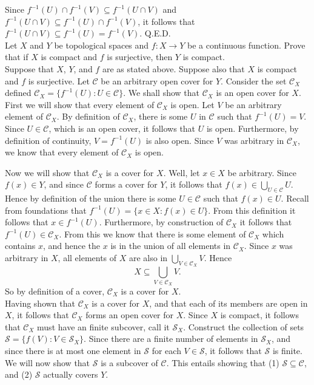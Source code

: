 \documentclass{article}
\newcommand{\inv}[1]{#1^{-1}}
\newcommand{\inv}[1]{#1^{-1}}
\begin{document}
Since $\inv{f}(U)\cap \inv{f}(V) \subseteq \inv{f}(U\cap V) $ and $\inv{f}(U\cap V) \subseteq  \inv{f}(U)\cap \inv{f}(V)$, it follows that $\inv{f}(U\cap V) \subseteq  \inv{f}(U)= \inv{f}(V)$. Q.E.D.\\


  Let $X$ and $Y$ be topological spaces and $f:X \rightarrow Y$ be a continuous function. 
Prove that if $X$ is compact and $f$ is surjective, then $Y$ is compact.\\

 Suppose that $X$, $Y$, and $f$ are as stated above. Suppose also that $X$ is compact and $f$ is surjective. Let $\mathcal{C}$ be an arbitrary open cover for $Y$. Consider the set $\mathcal{C}_X$ defined $\mathcal{C}_X = \{\inv{f}(U):U\in \mathcal{C}\}$. We shall show that $\mathcal{C}_X$ is an open cover for $X$.\\

First we will show that every element of $\mathcal{C}_X$ is open. Let $V$ be an arbitrary element of $\mathcal{C}_X$. By definition of $\mathcal{C}_X$, there is some $U$ in $\mathcal{C}$ such that $\inv{f}(U) = V$. Since $U\in \mathcal{C}$, which is an open cover, it follows that $U$ is open. Furthermore, by definition of continuity, $V = \inv{f}(U)$ is also open. Since $V$ was arbitrary in $\mathcal{C}_X$, we know that every element of $\mathcal{C}_X$ is open. 

Now we will show that $\mathcal{C}_X$ is a cover for $X$. Well, let $x\in X$ be arbitrary. Since $f(x)\in Y$, and since $\mathcal{C}$ forms a cover for $Y$, it follows that $f(x)\in \bigcup_{U\in \mathcal{C}}U$. Hence by definition of the union there is some $U\in \mathcal{C}$ such that $f(x)\in U$. Recall from foundations that $\inv{f}(U) = \{x\in X: f(x)\in U\}$. From this definition it follows that $x\in \inv{f}(U)$. Furthermore, by construction of $\mathcal{C}_X$ it follows that $\inv{f}(U)\in \mathcal{C}_X$. From this we know that there is some element of $\mathcal{C}_X$ which contains $x$, and hence the $x$ is in the union of all elements in $\mathcal{C}_X$. Since $x$ was arbitrary in $X$, all elements of $X$ are also in $\bigcup_{V\in \mathcal{C}_X}V$. Hence
$$X\subseteq\bigcup_{V\in \mathcal{C}_X}V.$$
So by definition of a cover, $\mathcal{C}_X$ is a cover for $X$. \\

Having shown that $\mathcal{C}_X$ is a cover for $X$, and that each of its members are open in $X$, it follows that $\mathcal{C}_X$ forms an open cover for $X$. Since $X$ is compact, it follows that $\mathcal{C}_X$ must have an finite subcover, call it $\mathcal{S}_X$. Construct the collection of sets $\mathcal{S} = \{f(V):V\in \mathcal{S}_X\}$. Since there are a finite number of elements in $\mathcal{S}_X$, and since there is at most one element in $\mathcal{S}$ for each $V\in \mathcal{S}$, it follows that $\mathcal{S}$ is finite. We will now show that $\mathcal{S}$ is a subcover of $\mathcal{C}$. This entails showing that (1) $\mathcal{S}\subseteq \mathcal{C}$, and (2) $\mathcal{S}$ actually covers $Y$. \\ 
\end{document}
